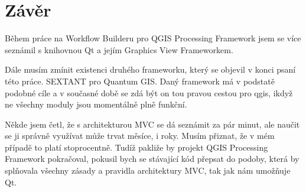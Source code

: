 \chapter*{Závěr}
Během práce na Workflow Builderu pro QGIS Processing Framework jsem se více seznámil s knihovnou Qt a jejím Graphics View Frameworkem.

Dále musím zmínit existenci druhého frameworku, který se objevil v konci psaní této práce. SEXTANT pro Quantum GIS. Daný framework má v podstatě podobné cíle a v současné době se zdá být on tou pravou cestou pro qgis, ikdyž ne všechny moduly jsou momentálně plně funkční. 

Někde jsem četl, že s architekturou MVC se dá seznámit za pár minut, ale naučit se ji správně využívat může trvat měsíce, i roky. Musím přiznat, že v mém případě to platí stoprocentně. Tudíž pakliže by projekt QGIS Processing Framework pokračoval, pokusil bych se stávající kód přepsat do podoby, která by splňovala všechny zásady a pravidla architektury MVC, tak jak nám umožňuje Qt.
